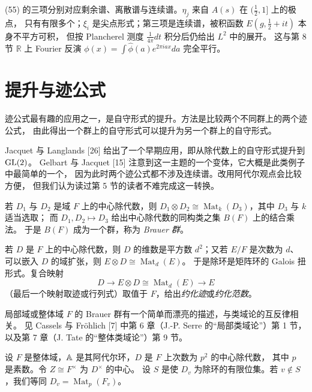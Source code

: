 \begin{annote}
(55) 的三项分别对应剩余谱、离散谱与连续谱。$\eta_{j}$ 来自 $A(s)$ 在 $(\tfrac12,1]$ 上的极点，
只有有限多个；$\xi_{i}$ 是尖点形式；第三项是连续谱，被积函数 $E(g,\tfrac12+it)$ 本身不平方可积，
但按 Plancherel 测度 $\frac{1}{4\pi}dt$ 积分后仍给出 $L^{2}$ 中的展开。
这与第 8 节 $\mathbb{R}$ 上 Fourier 反演 $\phi(x)=\int\hat\phi(a)e^{2\pi iax}da$ 完全平行。
\par\vspace{0.15em}{\raggedleft 【来源：Selberg, J. Indian Math. Soc. 20 (1956)；Godement, Proceedings of Symposia in Pure Mathematics 9 (1966)；Iwaniec, 1995, Ch.~7（A）】\par}
\end{annote}

\section{提升与迹公式}

迹公式最有趣的应用之一，是自守形式的提升。方法是比较两个不同群上的两个迹公式，
由此得出一个群上的自守形式可以提升为另一个群上的自守形式。

Jacquet 与 Langlands [26] 给出了一个早期应用，即从除代数上的自守形式提升到 $\mathrm{GL}(2)$。
Gelbart 与 Jacquet [15] 注意到这一主题的一个变体，它大概是此类例子中最简单的一个，
因为此时两个迹公式都不涉及连续谱。改用阿代尔观点会比较方便，
但我们认为读过第 5 节的读者不难完成这一转换。

若 $D_{1}$ 与 $D_{2}$ 是域 $F$ 上的中心除代数，则 $D_{1}\otimes D_{2}\cong
\operatorname{Mat}_{k}(D_{3})$，其中 $D_{3}$ 与 $k$ 适当选取；
而 $D_{1},D_{2}\mapsto D_{3}$ 给出中心除代数的同构类之集 $B(F)$ 上的结合乘法。
于是 $B(F)$ 成为一个群，称为 \emph{Brauer 群}。

若 $D$ 是 $F$ 上的中心除代数，则 $D$ 的维数是平方数 $d^{2}$；又若 $E/F$ 是次数为 $d$、
可以嵌入 $D$ 的域扩张，则 $E\otimes D\cong\operatorname{Mat}_{d}(E)$。
于是除环是矩阵环的 Galois 扭形式。复合映射
\[
D\to E\otimes D\cong\operatorname{Mat}_{d}(E)\to E
\]
（最后一个映射取迹或行列式）取值于 $F$，给出\emph{约化迹}或\emph{约化范数}。

局部域或整体域 $F$ 的 Brauer 群有一个简单而漂亮的描述，与类域论的互反律相关。
见 Cassels 与 Fr\"ohlich [7] 中第 6 章（J.-P. Serre 的“局部类域论”）第 1 节，
以及第 7 章（J. Tate 的“整体类域论”）第 9 节。

设 $F$ 是整体域，$\mathbb{A}$ 是其阿代尔环，$D$ 是 $F$ 上次数为 $p^{2}$ 的中心除代数，
其中 $p$ 是素数。令 $Z\cong F^{\times}$ 为 $D^{\times}$ 的中心。
设 $S$ 是使 $D_{v}$ 为除环的有限位集。若 $v\notin S$，我们等同 $D_{v}=\operatorname{Mat}_{p}(F_{v})$。

